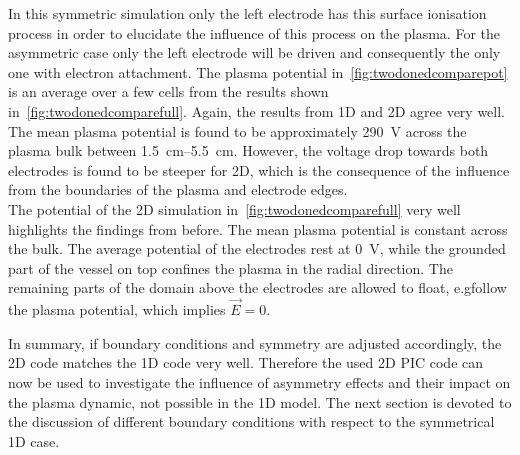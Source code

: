         In this symmetric simulation only the left electrode has this surface ionisation process in order to elucidate the influence of this process on the plasma. For the asymmetric case only the left electrode will be driven and consequently the only one with electron attachment.
        The plasma potential in~\autoref{fig:twodonedcomparepot} is an average over a few cells from the results shown in~\autoref{fig:twodonedcomparefull}. Again, the results from 1D and 2D agree very well. The mean plasma potential is found to be approximately \SI{290}{V} across the plasma bulk between \SIrange{1.5}{5.5}{\centi\metre}. However, the voltage drop towards both electrodes is found to be steeper for 2D, which is the consequence of the influence from the boundaries of the plasma and electrode edges.\\
        The potential of the 2D simulation in~\autoref{fig:twodonedcomparefull} very well highlights the findings from before. The mean plasma potential is constant across the bulk. The average potential of the electrodes rest at \SI{0}{\volt}, while the grounded part of the vessel on top confines the plasma in the radial direction. The remaining parts of the domain above the electrodes are allowed to float, e.g\@ follow the plasma potential, which implies $\vec{E}=0$. 
%
        \par%
        In summary, if boundary conditions and symmetry are adjusted accordingly, the 2D code matches the 1D code very well. Therefore the used 2D PIC code can now be used to investigate the influence of asymmetry effects and their impact on the plasma dynamic, not possible in the 1D model. The next section is devoted to the discussion of different boundary conditions with respect to the symmetrical 1D case.
%        
